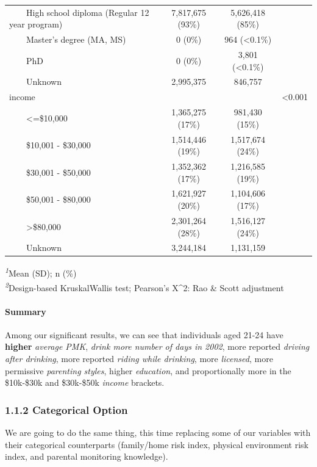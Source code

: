 \documentclass[
]{article}
\begin{document}
\begin{table}[t]
\begin{tabular*}{\linewidth}{@{\extracolsep{\fill}}lccc}
    High school diploma (Regular 12 year program) & 7,817,675 (93\%) & 5,626,418 (85\%) &  \\ 
    Master's degree (MA, MS) & 0 (0\%) & 964 (<0.1\%) &  \\ 
    PhD & 0 (0\%) & 3,801 (<0.1\%) &  \\ 
    Unknown & 2,995,375 & 846,757 &  \\ 
income &  &  & <0.001 \\ 
    <=\$10,000 & 1,365,275 (17\%) & 981,430 (15\%) &  \\ 
    \$10,001 - \$30,000 & 1,514,446 (19\%) & 1,517,674 (24\%) &  \\ 
    \$30,001 - \$50,000 & 1,352,362 (17\%) & 1,216,585 (19\%) &  \\ 
    \$50,001 - \$80,000 & 1,621,927 (20\%) & 1,104,606 (17\%) &  \\ 
    >\$80,000 & 2,301,264 (28\%) & 1,516,127 (24\%) &  \\ 
    Unknown & 3,244,184 & 1,131,159 &  \\ 
\bottomrule
\end{tabular*}
\begin{minipage}{\linewidth}
\textsuperscript{\textit{1}}Mean (SD); n (\%)\\
\textsuperscript{\textit{2}}Design-based KruskalWallis test; Pearson's X\^{}2: Rao \& Scott adjustment\\
\end{minipage}
\end{table}

\paragraph{Summary}\label{summary}

Among our significant results, we can see that individuals aged 21-24
have \textbf{higher} \emph{average PMK}, \emph{drink more number of days
in 2002}, more reported \emph{driving after drinking}, more reported
\emph{riding while drinking}, more \emph{licensed}, more permissive
\emph{parenting styles}, higher \emph{education}, and proportionally
more in the \$10k-\$30k and \$30k-\$50k \emph{income} brackets.

\subsubsection{1.1.2 Categorical Option}\label{categorical-option}

We are going to do the same thing, this time replacing some of our
variables with their categorical counterparts (family/home risk index,
physical environment risk index, and parental monitoring knowledge).
\end{document}
